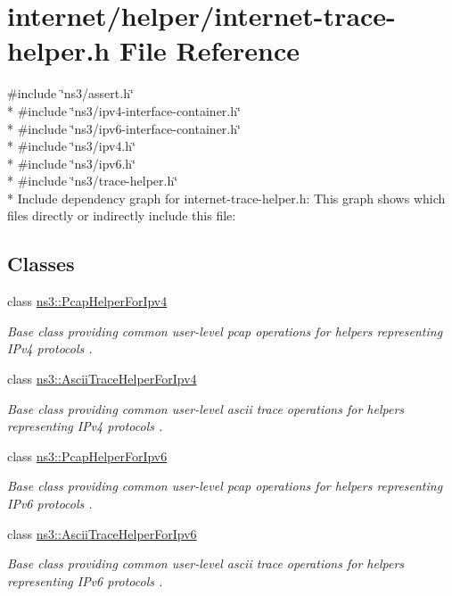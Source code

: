 \hypertarget{internet-trace-helper_8h}{}\section{internet/helper/internet-\/trace-\/helper.h File Reference}
\label{internet-trace-helper_8h}
{\ttfamily \#include \char`\"{}ns3/assert.\+h\char`\"{}}\\*
{\ttfamily \#include \char`\"{}ns3/ipv4-\/interface-\/container.\+h\char`\"{}}\\*
{\ttfamily \#include \char`\"{}ns3/ipv6-\/interface-\/container.\+h\char`\"{}}\\*
{\ttfamily \#include \char`\"{}ns3/ipv4.\+h\char`\"{}}\\*
{\ttfamily \#include \char`\"{}ns3/ipv6.\+h\char`\"{}}\\*
{\ttfamily \#include \char`\"{}ns3/trace-\/helper.\+h\char`\"{}}\\*
Include dependency graph for internet-\/trace-\/helper.h\+:
This graph shows which files directly or indirectly include this file\+:
\subsection*{Classes}
\begin{DoxyCompactItemize}
\item 
class \hyperlink{classns3_1_1PcapHelperForIpv4}{ns3\+::\+Pcap\+Helper\+For\+Ipv4}
\begin{DoxyCompactList}\small\item\em Base class providing common user-\/level pcap operations for helpers representing I\+Pv4 protocols . \end{DoxyCompactList}\item 
class \hyperlink{classns3_1_1AsciiTraceHelperForIpv4}{ns3\+::\+Ascii\+Trace\+Helper\+For\+Ipv4}
\begin{DoxyCompactList}\small\item\em Base class providing common user-\/level ascii trace operations for helpers representing I\+Pv4 protocols . \end{DoxyCompactList}\item 
class \hyperlink{classns3_1_1PcapHelperForIpv6}{ns3\+::\+Pcap\+Helper\+For\+Ipv6}
\begin{DoxyCompactList}\small\item\em Base class providing common user-\/level pcap operations for helpers representing I\+Pv6 protocols . \end{DoxyCompactList}\item 
class \hyperlink{classns3_1_1AsciiTraceHelperForIpv6}{ns3\+::\+Ascii\+Trace\+Helper\+For\+Ipv6}
\begin{DoxyCompactList}\small\item\em Base class providing common user-\/level ascii trace operations for helpers representing I\+Pv6 protocols . \end{DoxyCompactList}\end{DoxyCompactItemize}
